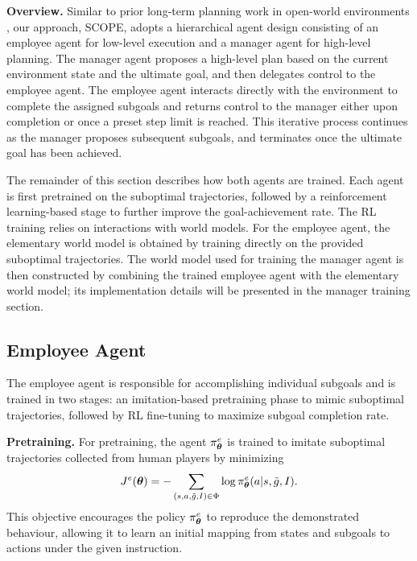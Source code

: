 \textbf{Overview.} Similar to prior long-term planning work in open-world environments \citep{AhnBBCC2022, WangCMLJLM2024}, our approach, SCOPE, adopts a hierarchical agent design consisting of an employee agent for low-level execution and a manager agent for high-level planning. The manager agent proposes a high-level plan based on the current environment state and the ultimate goal, and then delegates control to the employee agent. The employee agent interacts directly with the environment to complete the assigned subgoals and returns control to the manager either upon completion or once a preset step limit is reached. This iterative process continues as the manager proposes subsequent subgoals, and terminates once the ultimate goal has been achieved. 

The remainder of this section describes how both agents are trained. Each agent is first pretrained on the suboptimal trajectories, followed by a reinforcement learning-based stage to further improve the goal-achievement rate. The RL training relies on interactions with world models. For the employee agent, the elementary world model is obtained by training directly on the provided suboptimal trajectories. The world model used for training the manager agent is then constructed by combining the trained employee agent with the elementary world model; its implementation details will be presented in the manager training section.


\subsection{Employee Agent}
The employee agent is responsible for accomplishing individual subgoals and is trained in two stages: an imitation-based pretraining phase to mimic suboptimal trajectories, followed by RL fine-tuning to maximize subgoal completion rate.

\textbf{Pretraining.} For pretraining, the agent $\pi^e_{\boldsymbol \theta}$  is trained to imitate suboptimal trajectories collected from human players by minimizing 
\begin{align}
	J^e(\boldsymbol \theta) = - \sum_{(s, a, \tilde g, I) \in \Phi} \log \pi^e_{\boldsymbol \theta}(a \vert s, \tilde g, I). 
\end{align}
This objective encourages the policy \(\pi^e_{\boldsymbol \theta}\) to reproduce the demonstrated behaviour, allowing it to learn an initial mapping from states and subgoals to actions under the given instruction.

